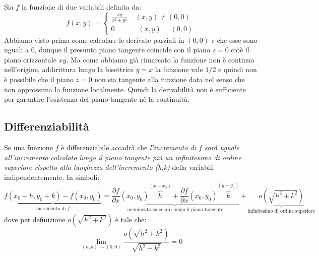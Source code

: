 \documentclass[a4paper]{article}
\numberwithin{equation}{subsection}
\begin{document}
\ex{}
{
    Sia $f$ la funzione di due variabili definita da: 
    \[f(x,y) = \begin{cases}
        \frac{xy}{x^2 + y^2} \; \; \; \; (x,y) \neq (0,0)\\
        0 \; \; \; \; \; \; \;  \; \; \; \; \; (x,y) = (0,0)
    \end{cases}\]
    Abbiamo visto prima come calcolare le derivate parziali in $(0,0)$ e che esse sono uguali a $0$, dunque il presunto 
    piano tangente coincide con il piano $z = 0$ cioè il piano orizzontale $xy$. Ma come abbiamo già rimarcato la funzione
    non è continua nell'origine, addirittura lungo la bisettrice $y = x$ la funzione vale $1/2$ e quindi non è possibile
    che il piano $z = 0$ non sia tangente alla funzione data nel senso che non approssima la funzione localmente. 
    Quindi la derivabilità non è sufficiente per garantire l'esistenza del piano tangente nè la continuità.
}

\subsection{Differenziabilità}

Se una funzione $f$ è differenziabile accadrà che \textit{l'incremento di $f$ sarà uguale all'incremento calcolato 
lungo il piano tangente più un infinitesimo di ordine superiore rispetto alla lunghezza dell'incremento (h,k)} della variabili indipendentemente.
In simboli:
\begin{equation}
    \underbrace{f(x_0 + h, y_0 + k) - f(x_0,y_0)}_{\text{incremento di $f$}} = \underbrace{\frac{\partial f}{\partial x} (x_0,y_0) \overbrace{h}^{(x-x_0)} + \frac{\partial f}{\partial x}(x_0, y_0) \overbrace{k}^{(y-y_0)}}_{\text{incremento calcolato lungo il piano tangente}} + \underbrace{o(\sqrt{h^2 + k^2})}_{\text{infinitesimo di ordine superiore}}
\end{equation}
\noindent
dove per definizione $o(\sqrt{h^2 + k^2})$ è tale che:
\[\lim_{(h,k) \rightarrow (0,0)} \frac{o(\sqrt{h^2 + k^2})}{\sqrt{h^2 + k^2}} = 0\]
\end{document}
